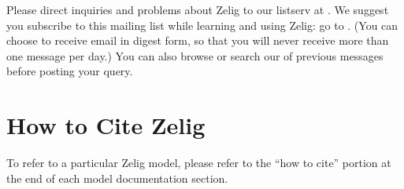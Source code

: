 Please direct inquiries and problems about Zelig to our listserv at
.  We
suggest you subscribe to this mailing list while learning and using
Zelig: go to .  (You can choose to receive email
in digest form, so that you will never receive more than one message
per day.)  You can also browse or search our
 of
previous messages before posting your query.

\section{How to Cite Zelig}

\CiteZelig

To refer to a particular Zelig model, please refer to the ``how to
cite'' portion at the end of each model documentation section.

